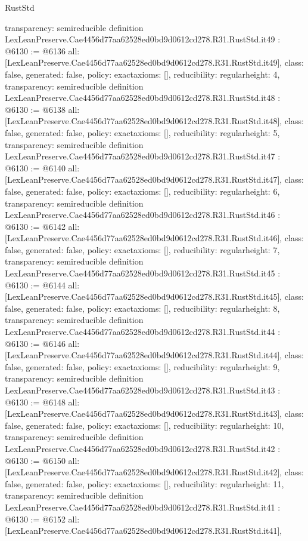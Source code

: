 \begin{lexlean}{RustStd}
\begin{coremodule}
{  transparency: semireducible
}
definition LexLeanPreserve.Cae4456d77aa62528ed0bd9d0612cd278.R31.RustStd.it49 : @6130 := @6136 {
  all: [LexLeanPreserve.Cae4456d77aa62528ed0bd9d0612cd278.R31.RustStd.it49],
  class: false,
  generated: false,
  policy: exact{axioms: []},
  reducibility: regular{height: 4},
  transparency: semireducible
}
definition LexLeanPreserve.Cae4456d77aa62528ed0bd9d0612cd278.R31.RustStd.it48 : @6130 := @6138 {
  all: [LexLeanPreserve.Cae4456d77aa62528ed0bd9d0612cd278.R31.RustStd.it48],
  class: false,
  generated: false,
  policy: exact{axioms: []},
  reducibility: regular{height: 5},
  transparency: semireducible
}
definition LexLeanPreserve.Cae4456d77aa62528ed0bd9d0612cd278.R31.RustStd.it47 : @6130 := @6140 {
  all: [LexLeanPreserve.Cae4456d77aa62528ed0bd9d0612cd278.R31.RustStd.it47],
  class: false,
  generated: false,
  policy: exact{axioms: []},
  reducibility: regular{height: 6},
  transparency: semireducible
}
definition LexLeanPreserve.Cae4456d77aa62528ed0bd9d0612cd278.R31.RustStd.it46 : @6130 := @6142 {
  all: [LexLeanPreserve.Cae4456d77aa62528ed0bd9d0612cd278.R31.RustStd.it46],
  class: false,
  generated: false,
  policy: exact{axioms: []},
  reducibility: regular{height: 7},
  transparency: semireducible
}
definition LexLeanPreserve.Cae4456d77aa62528ed0bd9d0612cd278.R31.RustStd.it45 : @6130 := @6144 {
  all: [LexLeanPreserve.Cae4456d77aa62528ed0bd9d0612cd278.R31.RustStd.it45],
  class: false,
  generated: false,
  policy: exact{axioms: []},
  reducibility: regular{height: 8},
  transparency: semireducible
}
definition LexLeanPreserve.Cae4456d77aa62528ed0bd9d0612cd278.R31.RustStd.it44 : @6130 := @6146 {
  all: [LexLeanPreserve.Cae4456d77aa62528ed0bd9d0612cd278.R31.RustStd.it44],
  class: false,
  generated: false,
  policy: exact{axioms: []},
  reducibility: regular{height: 9},
  transparency: semireducible
}
definition LexLeanPreserve.Cae4456d77aa62528ed0bd9d0612cd278.R31.RustStd.it43 : @6130 := @6148 {
  all: [LexLeanPreserve.Cae4456d77aa62528ed0bd9d0612cd278.R31.RustStd.it43],
  class: false,
  generated: false,
  policy: exact{axioms: []},
  reducibility: regular{height: 10},
  transparency: semireducible
}
definition LexLeanPreserve.Cae4456d77aa62528ed0bd9d0612cd278.R31.RustStd.it42 : @6130 := @6150 {
  all: [LexLeanPreserve.Cae4456d77aa62528ed0bd9d0612cd278.R31.RustStd.it42],
  class: false,
  generated: false,
  policy: exact{axioms: []},
  reducibility: regular{height: 11},
  transparency: semireducible
}
definition LexLeanPreserve.Cae4456d77aa62528ed0bd9d0612cd278.R31.RustStd.it41 : @6130 := @6152 {
  all: [LexLeanPreserve.Cae4456d77aa62528ed0bd9d0612cd278.R31.RustStd.it41],
}
\end{coremodule}
\end{lexlean}

